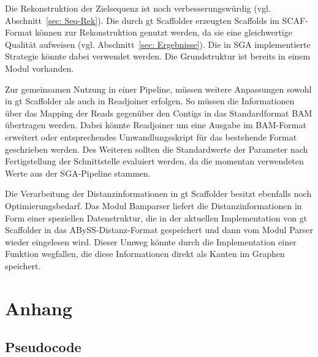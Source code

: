 \documentclass[a4paper,11pt,parskip,abstract=on]{scrartcl}
\begin{document}
Die Rekonstruktion der Zielsequenz ist noch verbesserungswürdig (vgl.
Abschnitt~\ref{sec: Seq-Rek}). Die durch gt Scaffolder
erzeugten Scaffolds im SCAF-Format können zur Rekonstruktion genutzt
werden, da sie eine gleichwertige Qualität aufweisen
(vgl. Abschnitt~\ref{sec: Ergebnisse}). Die in SGA implementierte
Strategie könnte dabei verwendet werden. Die Grundstruktur ist bereits
in einem Modul vorhanden.

Zur gemeinsamen Nutzung in einer Pipeline, müssen weitere Anpassungen sowohl
in gt Scaffolder als auch in Readjoiner erfolgen. So müssen die
Informationen über das Mapping der Reads gegenüber den Contigs in das
Standardformat BAM übertragen werden. Dabei könnte Readjoiner um
eine Ausgabe im BAM-Format erweitert oder entsprechendes Umwandlungsskript
für das bestehende Format geschrieben werden. Des Weiteren sollten die
Standardwerte der Parameter nach Fertigstellung der Schnittstelle evaluiert
werden, da die momentan verwendeten Werte aus der SGA-Pipeline stammen.

Die Verarbeitung der Distanzinformationen in gt Scaffolder besitzt ebenfalls
noch Optimierungsbedarf.
Das Modul Bamparser liefert die Distanzinformationen in Form einer speziellen
Datenstruktur, die in der aktuellen Implementation von gt Scaffolder in das
ABySS-Distanz-Format gespeichert und dann vom Modul Parser wieder eingelesen
wird. Dieser Umweg könnte durch die Implementation einer Funktion wegfallen,
die diese Informationen direkt als Kanten im Graphen speichert.


\section*{Anhang}
\subsection*{Pseudocode}
\end{document}
